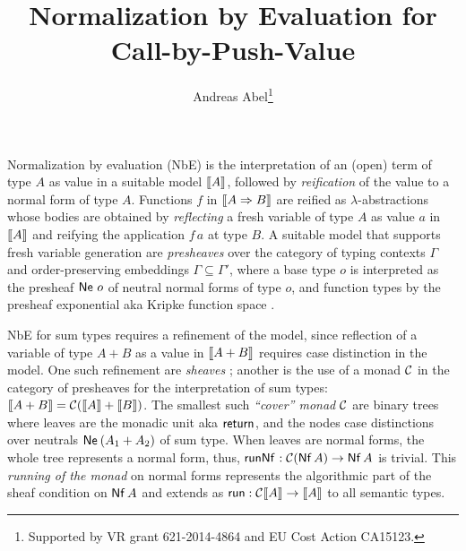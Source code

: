 \documentclass[a4paper]{easychair}
\begin{document}
\title{Normalization by Evaluation for Call-by-Push-Value}
\author{Andreas Abel\thanks{Supported by VR grant 621-2014-4864 and EU
  Cost Action CA15123.}}


\maketitle


\noindent

Normalization by evaluation (NbE) \citep{bergerSchwichtenberg:lics91}
is the interpretation of
an (open) term of type $A$ as value in a suitable model $\mathopen{{[\kern-0.14em[}} A \mathclose{{]\kern-0.14em]}}$,
followed by \emph{reification} of the value to a normal form of type
$A$.  Functions $f$ in $\mathopen{{[\kern-0.14em[}} A \Rightarrow B \mathclose{{]\kern-0.14em]}}$ are reified as
$\lambda$-abstractions whose bodies are obtained
by \emph{reflecting} a fresh variable of type $A$ as value $a$ in
$\mathopen{{[\kern-0.14em[}} A \mathclose{{]\kern-0.14em]}}$ and reifying the application $f\,a$ at type $B$.
A suitable model that supports fresh variable generation
are \emph{presheaves} over the category of
typing contexts $\Gamma$ and order-preserving embeddings
$\Gamma \subseteq \Gamma'$, where a base type $o$ is interpreted as
the presheaf $\mathsf{Ne}^{}\;o$ of neutral normal forms of type $o$, and
function types by the presheaf exponential aka Kripke function space
\citep{catarina:csl93,altenkirchHofmannStreicher:ctcs95}.

NbE for sum types requires a refinement of the model, since reflection of
a variable of type $A + B$ as a value in $\mathopen{{[\kern-0.14em[}} A + B \mathclose{{]\kern-0.14em]}}$ requires case
distinction in the model.  One such refinement are \emph{sheaves}
\citep{altenkirchDybjerHofmannScott:lics01}; another is the use of a
monad $\mathcal{C}$
\citep{%
filinski:tlca01,barral:PhD}
in the category of presheaves
for the interpretation of sum types:
$\mathopen{{[\kern-0.14em[}} A + B \mathclose{{]\kern-0.14em]}} = \mathcal{C}(\mathopen{{[\kern-0.14em[}} A \mathclose{{]\kern-0.14em]}} + \mathopen{{[\kern-0.14em[}} B \mathclose{{]\kern-0.14em]}})$.
The smallest such \emph{``cover'' monad} $\mathcal{C}$ are binary trees where leaves are
the monadic unit aka $\mathsf{return}^{}$, and the nodes case distinctions
over neutrals $\mathsf{Ne}^{}\,(A_1 + A_2)$ of sum type.  When leaves are normal
forms, the whole tree represents a normal form, thus,
$\mathsf{runNf}^{} : \mathcal{C}(\mathsf{Nf}\,A) \to \mathsf{Nf}\,A$ is trivial.
This \emph{running of the monad}
on normal forms represents the algorithmic part of the sheaf condition
on $\mathsf{Nf}\,A$ and extends as $\mathsf{run} : \mathcal{C} \mathopen{{[\kern-0.14em[}} A \mathclose{{]\kern-0.14em]}} \to \mathopen{{[\kern-0.14em[}} A \mathclose{{]\kern-0.14em]}}$ to all
semantic types.
\end{document}
